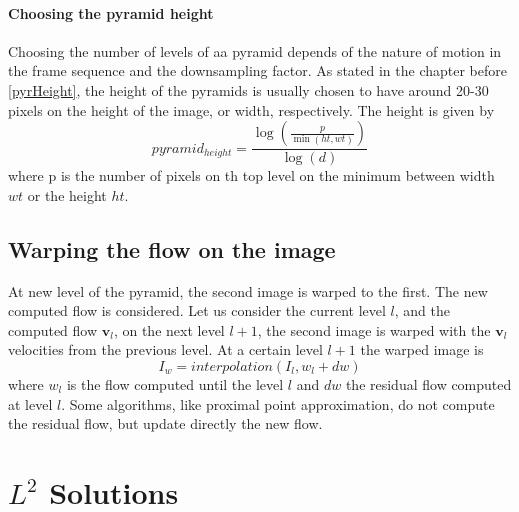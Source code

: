 \documentclass[12pt,a4paper,twoside]{report}
\begin{document}
\paragraph{Choosing the pyramid height} 
Choosing the number of levels of aa pyramid depends of the nature of motion in the frame sequence and the downsampling factor.
 As stated in the chapter before \ref{pyrHeight}, the height of the pyramids is usually chosen to have around 20-30 pixels on the height of the image, or width, respectively. The height is given by
\begin{equation}
	pyramid_{height} = \frac{\log\left(\frac{p}{\min(ht,wt)}\right)}
							{\log(d)}
\end{equation}
where p is the number of pixels on th top level on the minimum between  width $wt$ or the height $ht$.
\subsection{Warping the flow on the image}


At new level of the pyramid, the second image is warped to the first.
The new computed flow is considered.
Let us consider the current level $l$, and the computed flow $\boldsymbol{v}_l$, on the next level $l+1$, the second image is warped with the $\boldsymbol{v}_l$ velocities from the previous level.
At a certain level $l+1$ the warped image is 
\begin{equation}
I_w = interpolation(I_l, w_l+dw)
\end{equation}
where $w_l$ is the flow computed until the level $l$ and $dw$ the  residual flow computed at level $l$. Some algorithms, like proximal point approximation, do not compute the residual flow, but update directly the new flow.

\section{$L^2$ Solutions}
\end{document}
